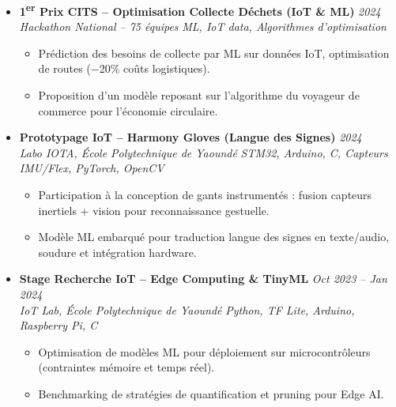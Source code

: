 \documentclass[a4paper,11pt]{article}
\begin{document}
\begin{itemize}[leftmargin=*, label={-}]
\item \textbf{1\textsuperscript{er} Prix CITS -- Optimisation Collecte Déchets (IoT \& ML)} \hfill \textit{2024} \\
\textit{Hackathon National -- 75 équipes} \hfill \textit{ML, IoT data, Algorithmes d'optimisation}
\vspace{-2pt}
    \begin{itemize}[leftmargin=0.4cm, nosep, label=\tiny$\bullet$]
        \item \small{Prédiction des besoins de collecte par ML sur données IoT, optimisation de routes ($-$20\% coûts logistiques).}
        \item \small{Proposition d'un modèle reposant sur l'algorithme du voyageur de commerce pour l'économie circulaire.}
    \end{itemize}
\vspace{3pt}

\item \textbf{Prototypage IoT -- Harmony Gloves (Langue des Signes)} \hfill \textit{2024} \\
\textit{Labo IOTA, École Polytechnique de Yaoundé} \hfill \textit{STM32, Arduino, C, Capteurs IMU/Flex, PyTorch, OpenCV}
\vspace{-2pt}
    \begin{itemize}[leftmargin=0.4cm, nosep, label=\tiny$\bullet$]
        \item \small{Participation à la conception de gants instrumentés : fusion capteurs inertiels + vision pour reconnaissance gestuelle.}
        \item \small{Modèle ML embarqué pour traduction langue des signes en texte/audio, soudure et intégration hardware.}
    \end{itemize}
\vspace{3pt}

\item \textbf{Stage Recherche IoT -- Edge Computing \& TinyML} \hfill \textit{Oct 2023 -- Jan 2024} \\
\textit{IoT Lab, École Polytechnique de Yaoundé} \hfill \textit{Python, TF Lite, Arduino, Raspberry Pi, C}
\vspace{-2pt}
    \begin{itemize}[leftmargin=0.4cm, nosep, label=\tiny$\bullet$]
        \item \small{Optimisation de modèles ML pour déploiement sur microcontrôleurs (contraintes mémoire et temps réel).}
        \item \small{Benchmarking de stratégies de quantification et pruning pour Edge AI.}
    \end{itemize}
\vspace{3pt}

\end{itemize}
\end{document}
